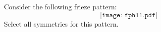 \documentclass{ximera}
\author{Bart Snapp}
\begin{document}
\begin{exercise}
  Consider the following frieze pattern:
  \[
  \texttt{[image: fph11.pdf]}
  \]
  Select all symmetries for this pattern.
  \begin{selectAll}
  \end{selectAll}
\end{exercise}
\end{document}
